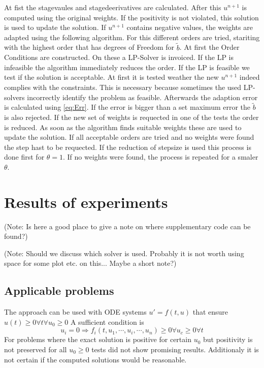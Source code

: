 \documentclass[a4paper]{article}
\numberwithin{equation}{section}
\theoremstyle{plain}
\theoremstyle{definition}
\numberwithin{theorem}{section}
\newcommand{\1}{\mathbbm{1}}
\begin{document}
At fist the stagevaules and stagedeerivatives are calculated.
After this $u^{n+1}$ is computed using the original weights. If the positivity is not violated, this solution is used to update the solution. 
If $u^{n+1}$ contains negative values, the weights are adapted using the following algorithm.
For this different orders are tried, stariting with the highest order that has degrees of Freedom for $\tilde{b}$. 
At first the Order Conditions are constructed. On these a LP-Solver is invoiced. If the LP is infeasible the algorithm immediately reduces the order. If the LP is feasible we test if the solution is acceptable. At first it is tested weather the new $u^{n+1}$ indeed complies with the constraints. This is necessary because sometimes the used LP-solvers incorrectly identify the problem as feasible. %
Afterwards the adaption error is calculated using \eqref{eq:Err}. If the error is bigger than a set maximum error the $\tilde{b}$ is also rejected.
If the new set of weights is requected in one of the tests the order is reduced.
As soon as the algorithm finds suitable weights these are used to update the solution.
If all acceptable orders are tried and no weights were found the step hast to be requected.
If the reduction of stepsize is used this process is done first for $\theta = 1$. If no weights were found, the process is repeated for a smaler $\theta$. 



\section{Results of experiments}\label{sec:Numeric_Results}

(Note: Is here a good place to give a note on where supplementary code can be found?)

(Note: Should we discuss which solver is used. Probably it is not worth using space for some plot etc. on this... Maybe a short note?)

\subsection{Applicable problems}\label{sec:app_problem}
The approach can be used with ODE systems $u' = f(t,u)$ that ensure  $u(t) \geq 0 \forall t \forall {  u_0 \geq 0}$ 
A sufficient condition is  
\begin{equation}
u_i=0 \Rightarrow f_i(t,u_1,\cdots,u_i,\cdots,u_n) \geq 0  \forall {u_c \geq 0} \forall {t}
\end{equation}
For problems where the exact solution is positive for certain $u_0$ but positivity is not preserved for all $u_0 \geq 0$ tests did not show promising results. Additionaly it is not certain if the computed solutions would be reasonable.
\end{document}
